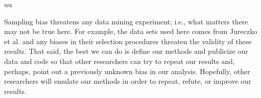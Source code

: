 uu \documentclass[final,twocolumn,5p]{elsarticle}
\newcommand{\fig}[1]{Figure~\ref{fig:#1}}
\theoremstyle{break}
\begin{document}
\begin{itemize}
Sampling bias threatens any data mining experiment; i.e., what matters
there may not be true here. For example, the data sets used here comes from Jureczko et al. and any biases in their selection procedures
threaten the validity of these results. 
That said,
the best we can do is define our methods and publicize our data and code so that other researchers can
try to repeat our results and, perhaps, point out a previously unknown bias
in our analysis. Hopefully, other researchers will emulate our methods in
order to repeat, refute, or improve our results. 








 


\end{itemize}
\end{document}
